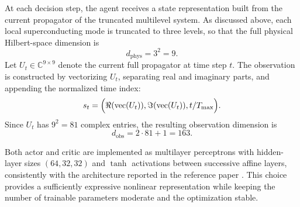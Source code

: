At each decision step, the agent receives a state representation built from the current propagator of the truncated multilevel system. As discussed above, each local superconducting mode is truncated to three levels, so that the full physical Hilbert-space dimension is
\begin{equation}
d_{\mathrm{phys}} = 3^2 = 9.
\label{eq:impl_physical_dimension_recalled}
\end{equation}
Let \(U_t \in \mathbb{C}^{9\times 9}\) denote the current full propagator at time step \(t\). The observation is constructed by vectorizing \(U_t\), separating real and imaginary parts, and appending the normalized time index:
\begin{equation}
s_t
=
\Bigl(
\Re(\mathrm{vec}(U_t)),
\Im(\mathrm{vec}(U_t)),
t/T_{\max}
\Bigr).
\label{eq:impl_state_representation_revised}
\end{equation}
Since \(U_t\) has \(9^2=81\) complex entries, the resulting observation dimension is
\begin{equation}
d_{\mathrm{obs}} = 2\cdot 81 + 1 = 163.
\label{eq:impl_observation_dimension_revised}
\end{equation}

Both actor and critic are implemented as multilayer perceptrons with hidden-layer sizes \((64,32,32)\) and \(\tanh\) activations between successive affine layers, consistently with the architecture reported in the reference paper \cite{Niu2019}. This choice provides a sufficiently expressive nonlinear representation while keeping the number of trainable parameters moderate and the optimization stable.

